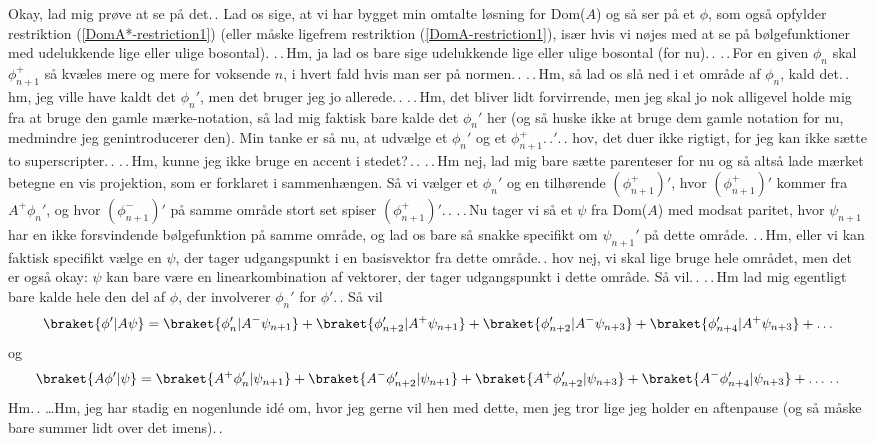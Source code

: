 \documentclass{report}
\begin{document}
Okay, lad mig prøve at se på det.\,. Lad os sige, at vi har bygget min omtalte løsning for Dom($A$) og så ser på et $\phi$, som også opfylder restriktion (\ref{DomA*-restriction1}) (eller måske ligefrem restriktion (\ref{DomA-restriction1}), især hvis vi nøjes med at se på bølgefunktioner med udelukkende lige eller ulige bosontal). .\,.\,Hm, ja lad os bare sige udelukkende lige eller ulige bosontal (for nu).\,. .\,.\,For en given $\phi_{n}$ skal $\phi^+_{n+1}$ så kvæles mere og mere for voksende $n$, i hvert fald hvis man ser på normen.\,. .\,.\,Hm, så lad os slå ned i et område af $\phi_{n}$, kald det.\,. hm, jeg ville have kaldt det $\phi_n'$, men det bruger jeg jo allerede.\,. .\,.\,Hm, det bliver lidt forvirrende, men jeg skal jo nok alligevel holde mig fra at bruge den gamle mærke-notation, så lad mig faktisk bare kalde det $\phi_n'$ her (og så huske ikke at bruge dem gamle notation for nu, medmindre jeg genintroducerer den). Min tanke er så nu, at udvælge et $\phi_n'$ og et $\phi_{n+1}^+.\,.'$.\,. hov, det duer ikke rigtigt, for jeg kan ikke sætte to superscripter.\,. .\,.\,Hm, kunne jeg ikke bruge en accent i stedet?\,.\,. .\,.\,Hm nej, lad mig bare sætte parenteser for nu og så altså lade mærket betegne en vis projektion, som er forklaret i sammenhængen. Så vi vælger et $\phi_n'$ og en tilhørende $(\phi^+_{n+1})'$, hvor $(\phi^+_{n+1})'$ kommer fra $A^+ \phi_n'$, og hvor $(\phi^-_{n+1})'$ på samme område stort set spiser $(\phi^+_{n+1})'$.\,. .\,.\,Nu tager vi så et $\psi$ fra Dom($A$) med modsat paritet, hvor $\psi_{n+1}$ har en ikke forsvindende bølgefunktion på samme område, og lad os bare så snakke specifikt om $\psi_{n+1}'$ på dette område. .\,.\,Hm, eller vi kan faktisk specifikt vælge en $\psi$, der tager udgangspunkt i en basisvektor fra dette område.\,. hov nej, vi skal lige bruge hele området, men det er også okay: $\psi$ kan bare være en linearkombination af vektorer, der tager udgangspunkt i dette område. Så vil.\,. .\,.\,Hm lad mig egentligt bare kalde hele den del af $\phi$, der involverer $\phi_n'$ for $\phi'$.\,. Så vil
\begin{align}
\begin{aligned}
	\braket{\phi'| A \psi} = 
		\braket{\phi'_{n}   | A^- \psi_{n+1}} + 
		\braket{\phi'_{n+2} | A^+ \psi_{n+1}} + 
		\braket{\phi'_{n+2} | A^- \psi_{n+3}} + 
		\braket{\phi'_{n+4} | A^+ \psi_{n+3}} + 
		\ldots
\end{aligned}
\end{align}
og
\begin{align}
\begin{aligned}
	\braket{A \phi'| \psi} = 
		\braket{A^+ \phi'_{n}   | \psi_{n+1}} + 
		\braket{A^- \phi'_{n+2} | \psi_{n+1}} + 
		\braket{A^+ \phi'_{n+2} | \psi_{n+3}} + 
		\braket{A^- \phi'_{n+4} | \psi_{n+3}} + 
		\ldots\,.\,.
\end{aligned}
\end{align}
Hm.\,. \ldots Hm, jeg har stadig en nogenlunde idé om, hvor jeg gerne vil hen med dette, men jeg tror lige jeg holder en aftenpause %
(og så måske bare summer lidt over det imens).\,. 
\end{document}
